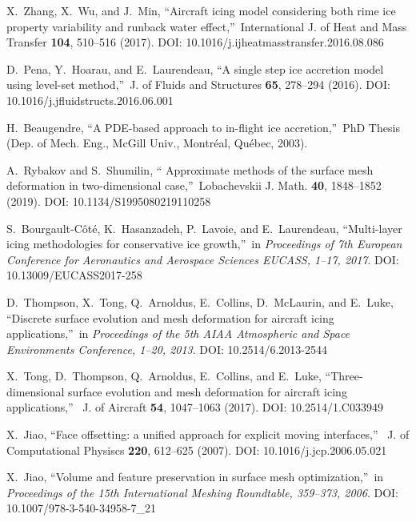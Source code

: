 \documentclass[
11pt,
tightenlines,
twoside,
onecolumn,
nofloats,
nobibnotes,
nofootinbib,
superscriptaddress,
noshowpacs,
centertags]
{revtex4-2}
\begin{document}
\begin{thebibliography}{99}
X.~Zhang, X.~Wu, and J.~Min, \textquotedblleft Aircraft icing  model
considering both rime ice property variability and runback water
effect,\textquotedblright \ International J. of Heat and Mass
Transfer {\bf 104}, 510--516 (2017). DOI: 10.1016/j.ijheatmasstransfer.2016.08.086

D.~Pena, Y.~Hoarau, and E.~Laurendeau, \textquotedblleft A  single
step ice accretion model using level-set method,\textquotedblright \
J. of Fluids and Structures {\bf 65}, 278--294 (2016). DOI: 10.1016/j.jfluidstructs.2016.06.001

 H.~Beaugendre, \textquotedblleft A PDE-based approach
to in-flight ice accretion,\textquotedblright \ PhD Thesis (Dep. of
Mech. Eng., McGill Univ., Montr\'eal, Qu\'ebec, 2003).

 A.~Rybakov and S.~Shumilin, \textquotedblleft
Approximate  methods of the surface mesh deformation in
two-dimensional case,\textquotedblright \ Lobachevskii J. Math. {\bf
40}, 1848--1852 (2019). DOI: 10.1134/S1995080219110258

 S.~Bourgault-C\^ot\'e, K.~Hasanzadeh, P.~Lavoie,
and E.~Laurendeau, \textquotedblleft Multi-layer  icing
methodologies for conservative ice growth,\textquotedblright \ in
\textit{Proceedings of 7th European Conference for Aeronautics and
Aerospace Sciences EUCASS, 1--17, 2017}. DOI: 10.13009/EUCASS2017-258

 D.~Thompson, X.~Tong, Q.~Arnoldus, E.~Collins,
D.~McLaurin, and E.~Luke, \textquotedblleft Discrete  surface
evolution and mesh deformation for aircraft icing
applications,\textquotedblright \ in \textit{Proceedings of the 5th
AIAA Atmospheric and Space Environments Conference, 1--20, 2013}. DOI: 10.2514/6.2013-2544

 X.~Tong, D.~Thompson, Q.~Arnoldus, E.~Collins, and
E.~Luke, \textquotedblleft Three-dimensional  surface evolution and
mesh deformation for aircraft icing applications,\textquotedblright
\ J. of Aircraft {\bf 54}, 1047--1063 (2017). DOI: 10.2514/1.C033949

 X.~Jiao, \textquotedblleft Face offsetting: a
unified approach  for explicit moving interfaces,\textquotedblright
\ J. of Computational Physiscs {\bf 220}, 612--625 (2007). DOI: 10.1016/j.jcp.2006.05.021

 X.~Jiao, \textquotedblleft Volume and feature
preservation in  surface mesh optimization,\textquotedblright \ in
\textit{Proceedings of the 15th International Meshing Roundtable, 359--373, 2006}. DOI: 10.1007/978-3-540-34958-7\_21


\end{thebibliography}
\end{document}
